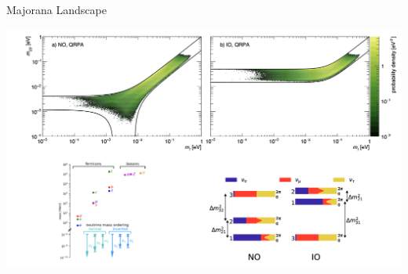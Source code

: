 \documentclass [aspectratio=169]{beamer}
\begin{document}

\begin{frame}{Majorana Landscape}

\includegraphics[scale=0.25]{landscape2.png}



%

\end{frame}
\end{document}
